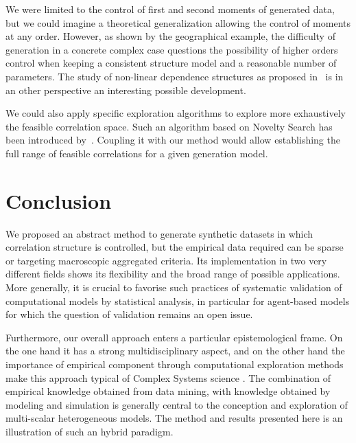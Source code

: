 \documentclass{bmcart}
\begin{document}
We were limited to the control of first and second moments of generated data, but we could imagine a theoretical generalization allowing the control of moments at any order. However, as shown by the geographical example, the difficulty of generation in a concrete complex case questions the possibility of higher orders control when keeping a consistent structure model and a reasonable number of parameters. The study of non-linear dependence structures as proposed in~\cite{chicheportiche2013nested} is in an other perspective an interesting possible development.

We could also apply specific exploration algorithms to explore more exhaustively the feasible correlation space. Such an algorithm based on Novelty Search has been introduced by~\cite{10.1371/journal.pone.0138212}. Coupling it with our method would allow establishing the full range of feasible correlations for a given generation model.





\section*{Conclusion}


We proposed an abstract method to generate synthetic datasets in which correlation structure is controlled, but the empirical data required can be sparse or targeting macroscopic aggregated criteria. Its implementation in two very different fields shows its flexibility and the broad range of possible applications. More generally, it is crucial to favorise such practices of systematic validation of computational models by statistical analysis, in particular for agent-based models for which the question of validation remains an open issue.


Furthermore, our overall approach enters a particular epistemological frame. On the one hand it has a strong multidisciplinary aspect, and on the other hand the importance of empirical component through computational exploration methods make this approach typical of Complex Systems science \cite{2009arXiv0907.2221B}. The combination of empirical knowledge obtained from data mining, with knowledge obtained by modeling and simulation is generally central to the conception and exploration of multi-scalar heterogeneous models. The method and results presented here is an illustration of such an hybrid paradigm.
\end{document}

